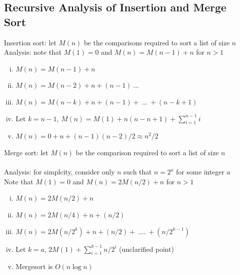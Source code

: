 \documentclass{article}
\begin{document}
		\subsection{Recursive Analysis of Insertion and Merge Sort}
			Insertion sort: let $M(n)$ be the comparisons required to sort a list of size $n$ \\
			Analysis: note that $M(1) = 0$ and $M(n) = M(n - 1) + n$ for $n > 1$
			\begin{enumerate}[(i)]
				\item $M(n) = M(n - 1) + n$
				\item $M(n) = M(n - 2) + n + (n - 1)\:...$
				\item $M(n) = M(n - k) + n + (n - 1) +\:...\:+ (n - k + 1)$
				\item Let $k = n - 1$, $M(n) = M(1) + n(n - n + 1) + \sum_{i = 1}^{n - 1}i$
				\item $M(n) = 0 + n + (n - 1)(n - 2)/2 \approx n^2/2$
				\end{enumerate}
			Merge sort: let $M(n)$ be the comparison required to sort a list of size $n$ \\
			\\
			Analysis: for simplcity, consider only $n$ such that $n = 2^a$ for some integer $a$ \\
			Note that $M(1) = 0$ and $M(n) = 2M(n/2) + n$ for $n > 1$
			\begin{enumerate}[(i)]
			 	\item $M(n) = 2M(n/2) + n$
			 	\item $M(n) = 2M(n/4) + n + (n/2)$
			 	\item $M(n) = 2M(n/2^k) + n + (n/2) +\:....\:+ (n/2^{k - 1})$
			 	\item Let $k = a$, $2M(1) + \sum_{i = 1}^{k - 1} n/2^i$ (unclarified point)
			 	\item Mergesort is $O(n \log n)$
			 	\end{enumerate}
\end{document}

